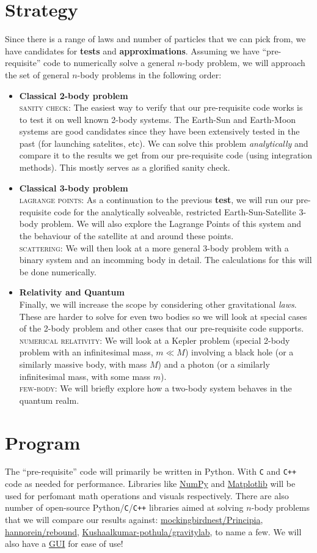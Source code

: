 \documentclass[hidelinks, 11pt]{article}
\newcommand{\psubsection}[1]{
    \noindent 
    \section*{#1}
}
\begin{document}
\psubsection{Strategy}
Since there is a range of laws and number of particles that we can pick from, we have candidates for \textbf{tests} and \textbf{approximations}. Assuming we have ``pre-requisite'' code to numerically solve a general $n$-body problem, we will approach the set of general $n$-body problems in the following order:
\begin{itemize}
    \item \textbf{Classical 2-body problem} \\ 
    \textsc{sanity check}: The easiest way to verify that our pre-requisite code works is to test it on well known 2-body systems. The Earth-Sun and Earth-Moon systems are good candidates since they have been extensively tested in the past (for launching satelites, etc). We can solve this problem \emph{analytically} and compare it to the results we get from our pre-requisite code (using integration methods). This mostly serves as a glorified sanity check.
    \item \textbf{Classical 3-body problem} \\ 
    \textsc{lagrange points}: As a continuation to the previous \textbf{test}, we will run our pre-requisite code for the analytically solveable, restricted Earth-Sun-Satellite 3-body problem. We will also explore the Lagrange Points of this system and the behaviour of the satellite at and around these points. \\
    \textsc{scattering}: We will then look at a more general 3-body problem with a binary system and an incomming body in detail. The calculations for this will be done numerically.
    \item \textbf{Relativity and Quantum} \\
    Finally, we will increase the scope by considering other gravitational \emph{laws}. These are harder to solve for even two bodies so we will look at special cases of the 2-body problem and other cases that our pre-requisite code supports. \\
    \textsc{numerical relativity}: We will look at a Kepler problem (special 2-body problem with an infinitesimal mass, $m \ll M$) involving a black hole (or a similarly massive body, with mass $M$) and a photon (or a similarly infinitesimal mass, with some mass $m$). \\
    \textsc{few-body}: We will briefly explore how a two-body system behaves in the quantum realm. 
\end{itemize}

\psubsection{Program}
The ``pre-requisite'' code will primarily be written in Python. With \texttt{C} and \texttt{C++} code as needed for performance. Libraries like \href{https://numpy.org/}{NumPy} and \href{https://matplotlib.org/}{Matplotlib} will be used for perfomant math operations and visuals respectively. There are also number of open-source Python/\texttt{C}/\texttt{C++} libraries aimed at solving $n$-body problems that we will compare our results against: \href{https://github.com/mockingbirdnest/Principia}{mockingbirdnest/Principia}, \href{https://github.com/hannorein/rebound}{hannorein/rebound}, \href{https://github.com/Kushaalkumar-pothula/gravitylab}{Kushaalkumar-pothula/gravitylab}, to name a few. We will also have a \href{https://www.qt.io/qt-for-python}{GUI} for ease of use!
\end{document}
